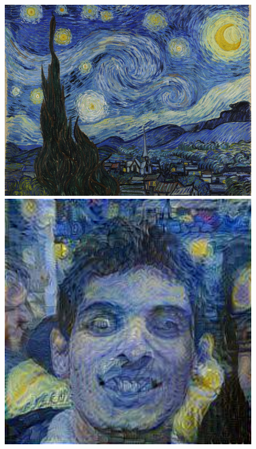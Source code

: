 \documentclass{article}
\begin{document}
\begin{figure}[!htb]
\centering
\begin{minipage}{0.25\textwidth}
\centering
\includegraphics[width=0.98\textwidth]{../Images//starry_night.jpg}
\end{minipage}%
\begin{minipage}{0.25\textwidth}
\centering
\includegraphics[width=0.98\textwidth]{../Images/transfer/tdf_starrynight.jpg}
\end{minipage}%

\end{figure}
\end{document}
